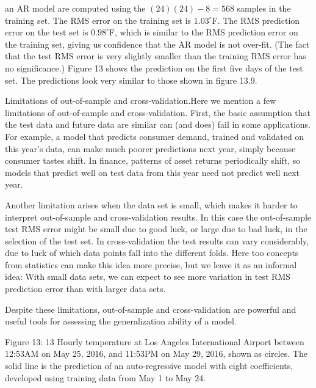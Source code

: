 an AR model are computed using the \((24)(24)-8=568\) samples in the training set. The RMS error on the training set is \(1.03^{\circ}\)F. The RMS prediction error on the test set is \(0.98^{\circ}\)F, which is similar to the RMS prediction error on the training set, giving us confidence that the AR model is not over-fit. (The fact that the test RMS error is very slightly smaller than the training RMS error has no significance.) Figure 13 shows the prediction on the first five days of the test set. The predictions look very similar to those shown in figure 13.9.

Limitations of out-of-sample and cross-validation.Here we mention a few limitations of out-of-sample and cross-validation. First, the basic assumption that the test data and future data are similar can (and does) fail in some applications. For example, a model that predicts consumer demand, trained and validated on this year's data, can make much poorer predictions next year, simply because consumer tastes shift. In finance, patterns of asset returns periodically shift, so models that predict well on test data from this year need not predict well next year.

Another limitation arises when the data set is small, which makes it harder to interpret out-of-sample and cross-validation results. In this case the out-of-sample test RMS error might be small due to good luck, or large due to bad luck, in the selection of the test set. In cross-validation the test results can vary considerably, due to luck of which data points fall into the different folds. Here too concepts from statistics can make this idea more precise, but we leave it as an informal idea: With small data sets, we can expect to see more variation in test RMS prediction error than with larger data sets.

Despite these limitations, out-of-sample and cross-validation are powerful and useful tools for assessing the generalization ability of a model.

Figure 13: 13 Hourly temperature at Los Angeles International Airport between 12:53AM on May 25, 2016, and 11:53PM on May 29, 2016, shown as circles. The solid line is the prediction of an auto-regressive model with eight coefficients, developed using training data from May 1 to May 24.

 